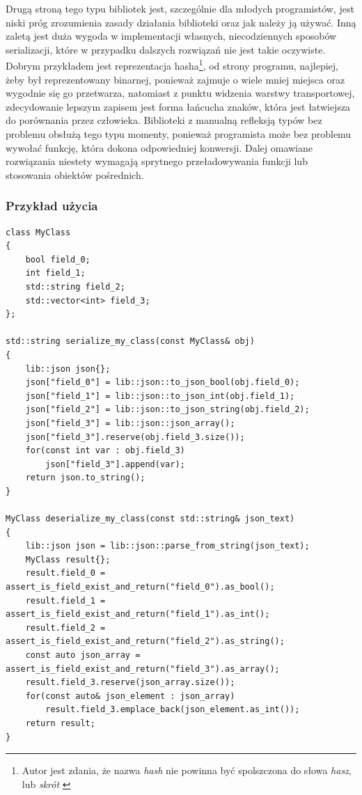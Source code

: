 \documentclass[12pt]{article}
\newcommand{\nonpl}[1]{{\it #1}}
\begin{document}
{{{				Drugą stroną tego typu bibliotek jest, szczególnie dla młodych programistów, jest niski próg zrozumienia zasady działania
				biblioteki oraz jak należy ją używać. Inną zaletą jest duża wygoda w implementacji własnych, niecodziennych sposobów serializacji,
				które w przypadku dalszych rozwiązań nie jest takie oczywiste. Dobrym przykładem jest reprezentacja hasha\footnote{
					Autor jest zdania, że nazwa \nonpl{hash} nie powinna być spolszczona do słowa \nonpl{hasz}, lub \nonpl{skrót} \cite{hash_po_angielskiemu}
				}, od strony programu, najlepiej, żeby był reprezentowany binarnej, ponieważ zajmuje o wiele mniej miejsca oraz wygodnie się go przetwarza,
				natomiast z punktu widzenia warstwy transportowej, zdecydowanie lepszym zapisem jest forma łańcucha znaków, która jest łatwiejsza do porównania
				przez człowieka. Biblioteki z manualną refleksją typów bez problemu obsłużą tego typu momenty, ponieważ programista może bez problemu
				wywołać funkcję, która dokona odpowiedniej konwersji. Dalej omawiane rozwiązania niestety wymagają sprytnego przeładowywania funkcji lub
				stosowania obiektów pośrednich.
			}

			{
				\subsubsection{Przykład użycia}

				\begin{lstlisting}[frame=single]
class MyClass
{
	bool field_0;
	int field_1;
	std::string field_2;
	std::vector<int> field_3;
};

std::string serialize_my_class(const MyClass& obj)
{
	lib::json json{};
	json["field_0"] = lib::json::to_json_bool(obj.field_0);
	json["field_1"] = lib::json::to_json_int(obj.field_1);
	json["field_2"] = lib::json::to_json_string(obj.field_2);
	json["field_3"] = lib::json::json_array();
	json["field_3"].reserve(obj.field_3.size());
	for(const int var : obj.field_3)
		json["field_3"].append(var);
	return json.to_string();
}

MyClass deserialize_my_class(const std::string& json_text)
{
	lib::json json = lib::json::parse_from_string(json_text);
	MyClass result{};
	result.field_0 = assert_is_field_exist_and_return("field_0").as_bool();
	result.field_1 = assert_is_field_exist_and_return("field_1").as_int();
	result.field_2 = assert_is_field_exist_and_return("field_2").as_string();
	const auto json_array = assert_is_field_exist_and_return("field_3").as_array();
	result.field_3.reserve(json_array.size());
	for(const auto& json_element : json_array)
		result.field_3.emplace_back(json_element.as_int());
	return result;
}
				\end{lstlisting}
			}
		}

}
\end{document}
